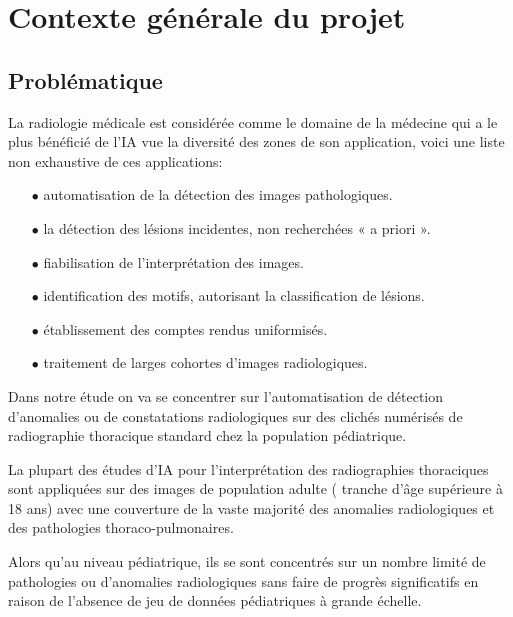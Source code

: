     \section{Contexte générale du projet}

        \subsection{Problématique}
            La radiologie médicale est considérée comme le domaine de la médecine qui a le plus bénéficié de l'IA  vue la diversité des zones de son application, voici une liste non exhaustive de ces applications:
            \vspace{3mm}
            \begin{itemize}
                \item[$\bullet$] automatisation de la détection des images pathologiques.
                \item[$\bullet$] la détection des lésions incidentes, non recherchées « a priori ».
                \item[$\bullet$] fiabilisation de l’interprétation des images.
                \item[$\bullet$] identification des motifs, autorisant la classification de lésions.
                \item[$\bullet$] établissement des comptes rendus uniformisés.
                \item[$\bullet$] traitement de larges cohortes d’images radiologiques. 
            \end{itemize}
            \vspace{5mm}

            Dans notre étude on va se concentrer sur l’automatisation de détection d’anomalies ou de constatations radiologiques sur des clichés numérisés de radiographie thoracique standard chez la population pédiatrique.

            La plupart des études d'IA pour l'interprétation des radiographies thoraciques sont appliquées sur des images de population adulte ( tranche d'âge supérieure à 18 ans) avec une couverture de la vaste majorité des anomalies radiologiques et des pathologies thoraco-pulmonaires.

            Alors qu’au niveau pédiatrique, ils se sont concentrés sur un nombre limité de pathologies ou d'anomalies radiologiques sans faire de progrès significatifs en raison de l'absence de  jeu de données  pédiatriques à grande échelle.

